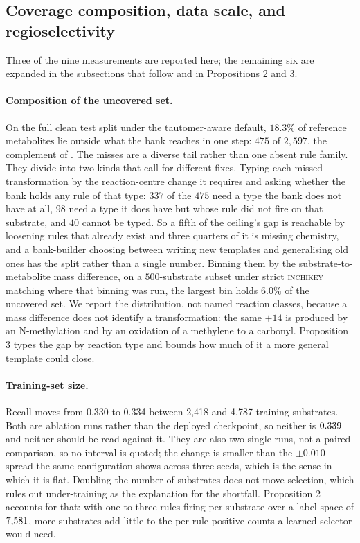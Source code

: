 \subsection{Coverage composition, data scale, and regioselectivity}

Three of the nine measurements are reported here; the remaining six are expanded in the
subsections that follow and in Propositions 2 and 3.

\paragraph{Composition of the uncovered set.}
On the full clean test split under the tautomer-aware default, $18.3\%$ of reference metabolites
lie outside what the bank reaches in one step: $475$ of $2{,}597$, the complement of \ceiling.
The misses are a diverse tail rather than one absent rule family. They divide into two kinds that call for
different fixes. Typing each missed transformation by the reaction-centre change it requires and
asking whether the bank holds any rule of that type: $337$ of the $475$ need a type the bank does
not have at all, $98$ need a type it does have but whose rule did not fire on that substrate, and
$40$ cannot be typed. So a fifth of the ceiling's gap is reachable by loosening rules that already
exist and three quarters of it is missing chemistry, and a bank-builder choosing between writing new
templates and generalising old ones has the split rather than a single number. Binning them by the
substrate-to-metabolite mass difference, on a $500$-substrate subset under strict \textsc{inchikey}
matching where that binning was run, the largest bin holds $6.0\%$ of the uncovered set. We
report the distribution, not named reaction classes, because a mass difference does not
identify a transformation: the same $+14$ is produced by an N-methylation and by an oxidation of a
methylene to a carbonyl. Proposition 3 types
the gap by reaction type and bounds how much of it a more general template could close.

\paragraph{Training-set size.}
Recall moves from 0.330 to 0.334 between 2{,}418 and 4{,}787 training substrates. Both are ablation
runs rather than the deployed checkpoint, so neither is $0.339$ and neither should be read
against it. They are also two single runs, not a paired comparison, so no interval is quoted; the change is smaller than the
$\pm0.010$ spread the same configuration shows across three seeds, which is the sense in which it
is flat. Doubling the number of substrates does not move selection, which rules out under-training as the
explanation for the shortfall. Proposition 2 accounts for that: with one to three rules firing per
substrate over a label space of $7{,}581$, more substrates add little to the per-rule positive counts
a learned selector would need.


